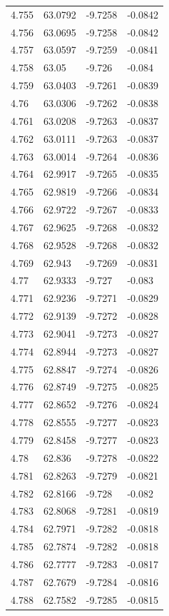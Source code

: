 \begin{tabular}{llll}
4.755 & 63.0792 & -9.7258 & -0.0842 \\
4.756 & 63.0695 & -9.7258 & -0.0842 \\
4.757 & 63.0597 & -9.7259 & -0.0841 \\
4.758 & 63.05 & -9.726 & -0.084 \\
4.759 & 63.0403 & -9.7261 & -0.0839 \\
4.76 & 63.0306 & -9.7262 & -0.0838 \\
4.761 & 63.0208 & -9.7263 & -0.0837 \\
4.762 & 63.0111 & -9.7263 & -0.0837 \\
4.763 & 63.0014 & -9.7264 & -0.0836 \\
4.764 & 62.9917 & -9.7265 & -0.0835 \\
4.765 & 62.9819 & -9.7266 & -0.0834 \\
4.766 & 62.9722 & -9.7267 & -0.0833 \\
4.767 & 62.9625 & -9.7268 & -0.0832 \\
4.768 & 62.9528 & -9.7268 & -0.0832 \\
4.769 & 62.943 & -9.7269 & -0.0831 \\
4.77 & 62.9333 & -9.727 & -0.083 \\
4.771 & 62.9236 & -9.7271 & -0.0829 \\
4.772 & 62.9139 & -9.7272 & -0.0828 \\
4.773 & 62.9041 & -9.7273 & -0.0827 \\
4.774 & 62.8944 & -9.7273 & -0.0827 \\
4.775 & 62.8847 & -9.7274 & -0.0826 \\
4.776 & 62.8749 & -9.7275 & -0.0825 \\
4.777 & 62.8652 & -9.7276 & -0.0824 \\
4.778 & 62.8555 & -9.7277 & -0.0823 \\
4.779 & 62.8458 & -9.7277 & -0.0823 \\
4.78 & 62.836 & -9.7278 & -0.0822 \\
4.781 & 62.8263 & -9.7279 & -0.0821 \\
4.782 & 62.8166 & -9.728 & -0.082 \\
4.783 & 62.8068 & -9.7281 & -0.0819 \\
4.784 & 62.7971 & -9.7282 & -0.0818 \\
4.785 & 62.7874 & -9.7282 & -0.0818 \\
4.786 & 62.7777 & -9.7283 & -0.0817 \\
4.787 & 62.7679 & -9.7284 & -0.0816 \\
4.788 & 62.7582 & -9.7285 & -0.0815 \\

\end{tabular}
